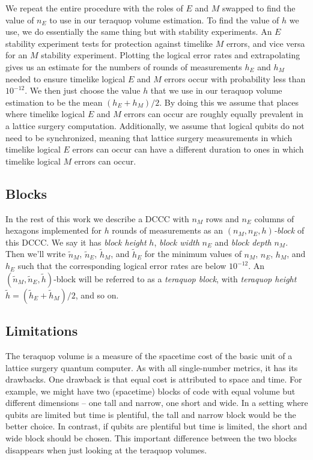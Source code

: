 We repeat the entire procedure with the roles of $E$ and $M$ swapped to find the value of $n_E$ to use in our teraquop volume estimation.
To find the value of $h$ we use, we do essentially the same thing but with stability experiments.
An $E$ stability experiment tests for protection against timelike $M$ errors, and vice versa for an $M$ stability experiment.
Plotting the logical error rates and extrapolating gives us an estimate for the numbers of rounds of measurements $h_E$ and $h_M$ needed to ensure timelike logical $E$ and $M$ errors occur with probability less than $10^{-12}$.
We then just choose the value $h$ that we use in our teraquop volume estimation to be the mean $(h_E + h_M)/2$.
By doing this we assume that places where timelike logical $E$ and $M$ errors can occur are roughly equally prevalent in a lattice surgery computation.
Additionally, we assume that logical qubits do not need to be synchronized, meaning that lattice surgery measurements in which timelike logical $E$ errors can occur can have a different duration to ones in which timelike logical $M$ errors can occur.

\subsection{Blocks}\label{teraquop-blocks}

In the rest of this work we describe a DCCC with $n_M$ rows and $n_E$ columns of hexagons implemented for $h$ rounds of measurements as an \textit{$(n_M, n_E, h)$-block} of this DCCC.
We say it has \textit{block height} $h$, \textit{block width} $n_E$ and \textit{block depth} $n_M$.
Then we'll write $\tilde{n}_M$, $\tilde{n}_E$, $\tilde{h}_M$, and $\tilde{h}_E$ for the minimum values of $n_M$, $n_E$, $h_M$, and $h_E$ such that the corresponding logical error rates are below $10^{-12}$.
An $(\tilde{n}_M, \tilde{n}_E, \tilde{h})$-block will be referred to as a \textit{teraquop block},
with \textit{teraquop height} $\tilde{h} = (\tilde{h}_E + \tilde{h}_M)/2$, and so on.

\subsection{Limitations}\label{subsec:teraquop-limitations}

The teraquop volume is a measure of the spacetime cost of the basic unit of a lattice surgery quantum computer. As with all single-number metrics, it has its drawbacks. 
One drawback is that equal cost is attributed to space and time. 
For example, we might have two (spacetime) blocks of code with equal volume but different dimensions -- one tall and narrow, one short and wide.
In a setting where qubits are limited but time is plentiful, the tall and narrow block would be the better choice.
In contrast, if qubits are plentiful but time is limited, the short and wide block should be chosen. 
This important difference between the two blocks disappears when just looking at the teraquop volumes.


